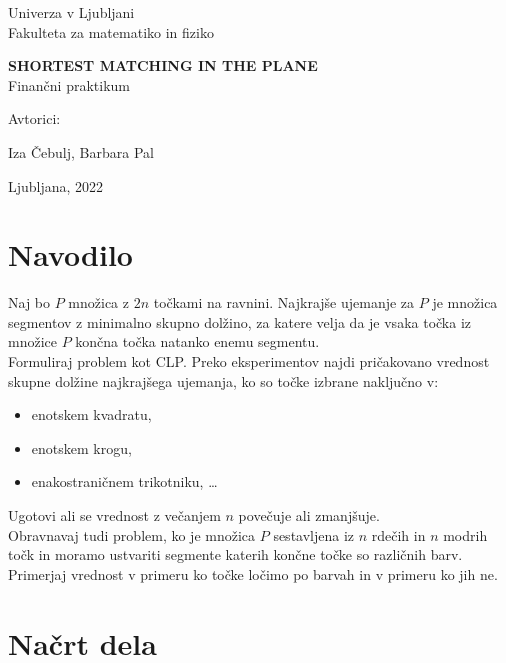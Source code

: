 \documentclass[a4paper, 11pt]{article}
\begin{document}
\thispagestyle{empty}
\begin{center}
\begin{minipage}{0.75\linewidth}
    \centering
    {\Large Univerza v Ljubljani \\ Fakulteta za matematiko in fiziko}
    \\
    \vspace{7cm}

    {\uppercase{\Large \textbf{Shortest matching in the plane}}} \\ Finančni praktikum \\
    \vspace{3cm}

    Avtorici:\\
    {\Large Iza Čebulj, Barbara Pal\par}
    \vspace{7cm}

    {\Large Ljubljana, 2022}
\end{minipage}
\end{center}

\newpage
 
\section{Navodilo}

Naj bo $P$ množica z $2n$ točkami na ravnini. Najkrajše ujemanje za $P$ je množica segmentov z minimalno skupno dolžino, za katere velja da je vsaka točka iz množice $P$ končna točka natanko enemu segmentu. \\
Formuliraj problem kot CLP. Preko eksperimentov najdi pričakovano vrednost skupne dolžine najkrajšega ujemanja, ko so točke izbrane naključno v:
\begin{itemize}
    \item enotskem kvadratu,
    \item enotskem krogu,
    \item enakostraničnem trikotniku, \dots
\end{itemize}
Ugotovi ali se vrednost z večanjem $n$ povečuje ali zmanjšuje. \\
Obravnavaj tudi problem, ko je množica $P$ sestavljena iz $n$ rdečih in $n$ modrih točk in moramo ustvariti segmente katerih končne točke so različnih barv. Primerjaj vrednost v primeru ko točke ločimo po barvah in v primeru ko jih ne.  

\section{Načrt dela}
\end{document}
